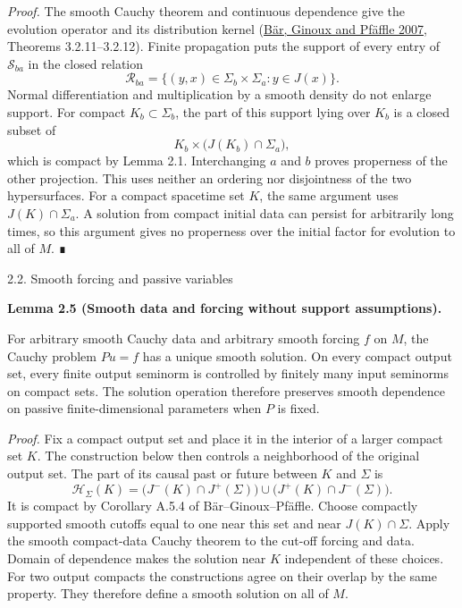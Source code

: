 \documentclass[
  english,
  11pt,
  reqno]{amsart}
\makeatletter
\newcommand{\paperstatementsection}{\@startsection{subsection}{2}%
  \z@{.5\linespacing\@plus.7\linespacing}{.35\baselineskip}%
  {\normalfont\bfseries}}
\newcommand{\paperfirststatement}[1]{%
  {\normalfont\bfseries #1\par}%
  \nobreak\@afterindenttrue\@afterheading}
\makeatother
\begin{document}
\emph{Proof.} The smooth Cauchy theorem and continuous dependence give
the evolution operator and its distribution kernel
(\hyperref[ref-BarGinouxPfaeffle2007]{Bär, Ginoux and Pfäffle 2007},
Theorems 3.2.11--3.2.12). Finite propagation puts the support of every
entry of \(\mathcal S_{ba}\) in the closed relation \[
\mathcal R_{ba}
=\{(y,x)\in\Sigma_b\times\Sigma_a:y\in J(x)\}.
\] Normal differentiation and multiplication by a smooth density do not
enlarge support. For compact \(K_b\subset\Sigma_b\), the part of this
support lying over \(K_b\) is a closed subset of \[
K_b\times\bigl(J(K_b)\cap\Sigma_a\bigr),
\] which is compact by Lemma 2.1. Interchanging \(a\) and \(b\) proves
properness of the other projection. This uses neither an ordering nor
disjointness of the two hypersurfaces. For a compact spacetime set
\(K\), the same argument uses \(J(K)\cap\Sigma_a\). A solution from
compact initial data can persist for arbitrarily long times, so this
argument gives no properness over the initial factor for evolution to
all of \(M\). ∎

\protect{}\label{sec:smooth-and-passive-regularity}
\paperstatementsection{2.2. Smooth forcing and passive
variables}\label{smooth-forcing-and-passive-variables}
\paperfirststatement{\protect{}\label{lem:smooth-noncompact-cauchy}Lemma 2.5 (Smooth data and forcing without support assumptions).}

For arbitrary smooth Cauchy data and arbitrary smooth forcing \(f\) on
\(M\), the Cauchy problem \(Pu=f\) has a unique smooth solution. On
every compact output set, every finite output seminorm is controlled by
finitely many input seminorms on compact sets. The solution operation
therefore preserves smooth dependence on passive finite-dimensional
parameters when \(P\) is fixed.

\emph{Proof.} Fix a compact output set and place it in the interior of a
larger compact set \(K\). The construction below then controls a
neighborhood of the original output set. The part of its causal past or
future between \(K\) and \(\Sigma\) is \[
\mathcal H_\Sigma(K)
=\bigl(J^-(K)\cap J^+(\Sigma)\bigr)
\cup\bigl(J^+(K)\cap J^-(\Sigma)\bigr).
\] It is compact by Corollary A.5.4 of Bär--Ginoux--Pfäffle. Choose
compactly supported smooth cutoffs equal to one near this set and near
\(J(K)\cap\Sigma\). Apply the smooth compact-data Cauchy theorem to the
cut-off forcing and data. Domain of dependence makes the solution near
\(K\) independent of these choices. For two output compacts the
constructions agree on their overlap by the same property. They
therefore define a smooth solution on all of \(M\).
\end{document}
